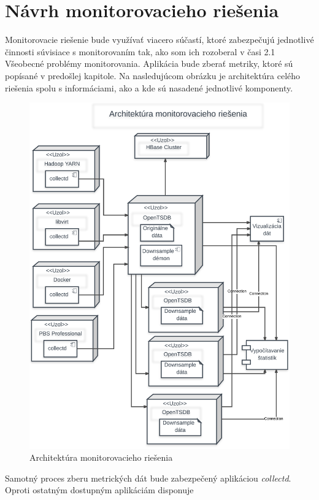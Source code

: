 \documentclass[printed,11pt,twoside,color,cover,table]{fithesis3}
\begin{document}
\section{Návrh monitorovacieho riešenia}
Monitorovacie riešenie bude využívať viacero súčastí, ktoré zabezpečujú jednotlivé činnosti súvisiace s monitorovaním tak, ako som ich rozoberal v časi 2.1 Všeobecné problémy monitorovania.
Aplikácia bude zberať metriky, ktoré sú popísané v predošlej kapitole. Na nasledujúcom obrázku je architektúra celého riešenia spolu s informáciami, ako a kde sú nasadené jednotlivé komponenty.
\begin{figure}
\begin{center}
       \includegraphics[width=1.0\textwidth]{images/architektura.png}
       \caption{Architektúra monitorovacieho riešenia}
\end{center}
\end{figure}
Samotný proces zberu metrických dát bude zabezpečený aplikáciou \emph{collectd}. Oproti ostatným dostupným aplikáciám disponuje
\end{document}
